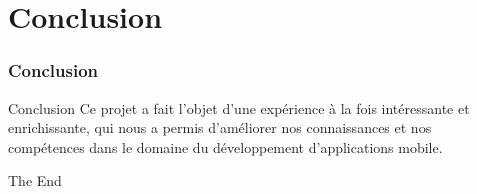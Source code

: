 \documentclass{beamer}
\begin{document}
\section{Conclusion}


\begin{frame}
\frametitle{Conclusion}
	\begin{block}{Conclusion}
	Ce projet a fait l'objet d'une expérience à  la fois intéressante et enrichissante, qui nous a permis d'améliorer nos connaissances et nos compétences dans le domaine du développement d'applications mobile.
	\end{block}
\end{frame}

\begin{frame}
\Huge{\centerline{The End}}
\end{frame}

\end{document}
